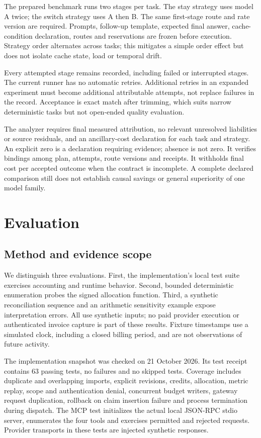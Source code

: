 \documentclass[10pt,twocolumn]{article}
\begin{document}
The prepared benchmark runs two stages per task. The stay strategy uses model A twice; the switch strategy uses A then B. The same first-stage route and rate version are required. Prompts, follow-up template, expected final answer, cache-condition declaration, routes and reservations are frozen before execution. Strategy order alternates across tasks; this mitigates a simple order effect but does not isolate cache state, load or temporal drift.

Every attempted stage remains recorded, including failed or interrupted stages. The current runner has no automatic retries. Additional retries in an expanded experiment must become additional attributable attempts, not replace failures in the record. Acceptance is exact match after trimming, which suits narrow deterministic tasks but not open-ended quality evaluation.

The analyzer requires final measured attribution, no relevant unresolved liabilities or source residuals, and an ancillary-cost declaration for each task and strategy. An explicit zero is a declaration requiring evidence; absence is not zero. It verifies bindings among plan, attempts, route versions and receipts. It withholds final cost per accepted outcome when the contract is incomplete. A complete declared comparison still does not establish causal savings or general superiority of one model family.

\section{Evaluation}
\label{sec:evaluation}

\subsection{Method and evidence scope}

We distinguish three evaluations. First, the implementation's local test suite exercises accounting and runtime behavior. Second, bounded deterministic enumeration probes the signed allocation function. Third, a synthetic reconciliation sequence and an arithmetic sensitivity example expose interpretation errors. All use synthetic inputs; no paid provider execution or authenticated invoice capture is part of these results. Fixture timestamps use a simulated clock, including a closed billing period, and are not observations of future activity.

The implementation snapshot was checked on 21 October 2026. Its test receipt contains 63 passing tests, no failures and no skipped tests. Coverage includes duplicate and overlapping imports, explicit revisions, credits, allocation, metric replay, scope and authentication denial, concurrent budget writers, gateway request duplication, rollback on claim insertion failure and process termination during dispatch. The MCP test initializes the actual local JSON-RPC stdio server, enumerates the four tools and exercises permitted and rejected requests. Provider transports in these tests are injected synthetic responses.
\end{document}
